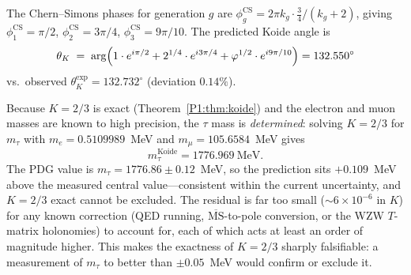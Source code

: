 \begin{result}
\label{P1:res:koide_angle}
The Chern--Simons phases for generation $g$ are
$\phi_g^{\mathrm{CS}} = 2\pi k_g\cdot\tfrac{3}{4}/(k_g+2)$,
giving $\phi_1^{\mathrm{CS}} = \pi/2$, $\phi_2^{\mathrm{CS}} = 3\pi/4$,
$\phi_3^{\mathrm{CS}} = 9\pi/10$.
The predicted Koide angle is
\begin{equation}
  \theta_K \;=\;
  \arg\!\left(
    1\cdot e^{i\pi/2}
    + 2^{1/4}\cdot e^{i3\pi/4}
    + \varphi^{1/2}\cdot e^{i9\pi/10}
  \right) = 132.550^{\circ}
  \label{P1:eq:thetaK}
\end{equation}
vs.\ observed $\theta_K^{\mathrm{exp}} = 132.732^{\circ}$ (deviation $0.14\%$).
\end{result}

\begin{remark}
\label{P1:rem:koide_tau}
Because $K=2/3$ is exact (Theorem~\ref{P1:thm:koide}) and the electron and
muon masses are known to high precision, the $\tau$ mass is \emph{determined}:
solving $K=2/3$ for $m_\tau$ with $m_e=0.5109989$~MeV and
$m_\mu=105.6584$~MeV gives
\begin{equation}
  m_\tau^{\mathrm{Koide}} = 1776.969~\mathrm{MeV}.
  \label{P1:eq:mtau_koide}
\end{equation}
The PDG value is $m_\tau = 1776.86\pm0.12$~MeV, so the
prediction sits $+0.109$~MeV above the measured central
value---consistent within the current uncertainty, and $K=2/3$ exact
cannot be excluded.  The residual is far too small
($\sim6\times10^{-6}$ in $K$) for any known correction (QED running,
$\overline{\mathrm{MS}}$-to-pole conversion, or the WZW $T$-matrix
holonomies) to account for, each of which acts at least an order of
magnitude higher.  This makes the exactness of $K=2/3$ sharply
falsifiable: a measurement of $m_\tau$ to better than $\pm0.05$~MeV
would confirm or exclude it.
\end{remark}

